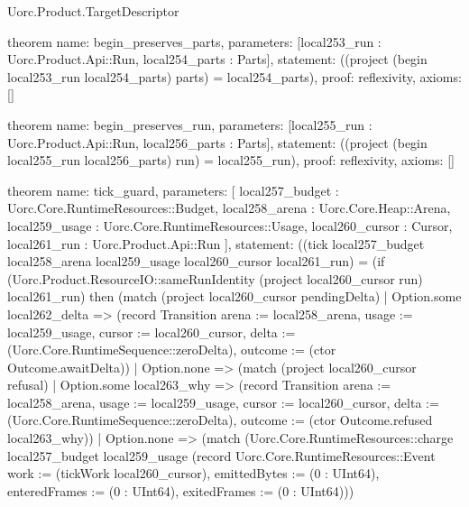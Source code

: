 \begin{lexlean}{Uorc.Product.TargetDescriptor}
\begin{semanticmodule}
theorem{
  name: begin_preserves_parts,
  parameters: [local253_run : Uorc.Product.Api::Run, local254_parts : Parts],
  statement: ((project (begin local253_run local254_parts) parts) = local254_parts),
  proof: reflexivity{},
  axioms: []
}

theorem{
  name: begin_preserves_run,
  parameters: [local255_run : Uorc.Product.Api::Run, local256_parts : Parts],
  statement: ((project (begin local255_run local256_parts) run) = local255_run),
  proof: reflexivity{},
  axioms: []
}

theorem{
  name: tick_guard,
  parameters: [
    local257_budget : Uorc.Core.RuntimeResources::Budget,
    local258_arena : Uorc.Core.Heap::Arena,
    local259_usage : Uorc.Core.RuntimeResources::Usage,
    local260_cursor : Cursor,
    local261_run : Uorc.Product.Api::Run
  ],
  statement: ((tick local257_budget local258_arena local259_usage local260_cursor local261_run) = (if (Uorc.Product.ResourceIO::sameRunIdentity (project local260_cursor run) local261_run) then (match (project local260_cursor pendingDelta)
    | Option.some local262_delta => (record Transition {arena := local258_arena, usage := local259_usage, cursor := local260_cursor, delta := (Uorc.Core.RuntimeSequence::zeroDelta), outcome := (ctor Outcome.awaitDelta)})
    | Option.none => (match (project local260_cursor refusal)
      | Option.some local263_why => (record Transition {arena := local258_arena, usage := local259_usage, cursor := local260_cursor, delta := (Uorc.Core.RuntimeSequence::zeroDelta), outcome := (ctor Outcome.refused local263_why)})
      | Option.none => (match (Uorc.Core.RuntimeResources::charge local257_budget local259_usage (record Uorc.Core.RuntimeResources::Event {work := (tickWork local260_cursor), emittedBytes := (0 : UInt64), enteredFrames := (0 : UInt64), exitedFrames := (0 : UInt64)}))
}
\end{semanticmodule}
\end{lexlean}
